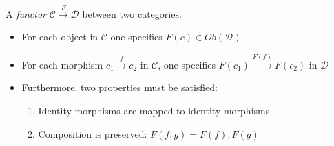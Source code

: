 A \emph{functor} $\mathcal{C}\xrightarrow{F}\mathcal{D}$ between two \href{doc/1 math/Seven Sketches in Compositionality/Chapter 3: Databases/2 Categories/1 Free Categories/1 Category}{categories}.

\begin{itemize}
    \item  For each object in $\mathcal{C}$ one specifies $F(c) \in Ob(\mathcal{D})$
    \item For each morphism $c_1\xrightarrow{f}c_2$ in $\mathcal{C}$, one specifies $F(c_1)\xrightarrow{F(f)}F(c_2)$ in $\mathcal{D}$
    \item Furthermore, two properties must be satisfied:
          \begin{enumerate}
            \item Identity morphisms are mapped to identity morphisms
            \item Composition is preserved: $F(f;g)=F(f);F(g)$
          \end{enumerate}
  \end{itemize}
